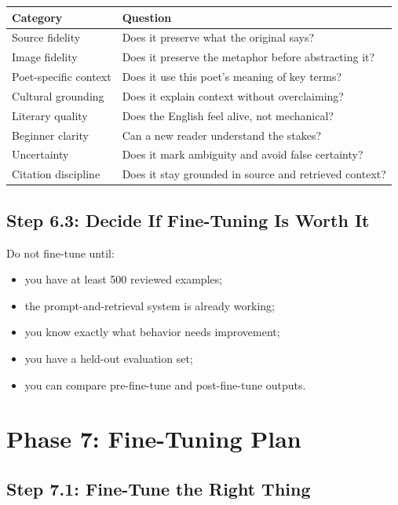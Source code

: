 \documentclass[11pt]{article}
\begin{document}
\begin{longtable}{>{\raggedright\arraybackslash}p{}
                  >{\raggedright\arraybackslash}p{}}
\textbf{Category} & \textbf{Question} \\
\hline
Source fidelity & Does it preserve what the original says? \\
Image fidelity & Does it preserve the metaphor before abstracting it? \\
Poet-specific context & Does it use this poet's meaning of key terms? \\
Cultural grounding & Does it explain context without overclaiming? \\
Literary quality & Does the English feel alive, not mechanical? \\
Beginner clarity & Can a new reader understand the stakes? \\
Uncertainty & Does it mark ambiguity and avoid false certainty? \\
Citation discipline & Does it stay grounded in source and retrieved context? \\
\end{longtable}

\subsection{Step 6.3: Decide If Fine-Tuning Is Worth It}

Do not fine-tune until:

\begin{itemize}
  \item you have at least 500 reviewed examples;
  \item the prompt-and-retrieval system is already working;
  \item you know exactly what behavior needs improvement;
  \item you have a held-out evaluation set;
  \item you can compare pre-fine-tune and post-fine-tune outputs.
\end{itemize}

\section{Phase 7: Fine-Tuning Plan}

\subsection{Step 7.1: Fine-Tune the Right Thing}
\end{document}
